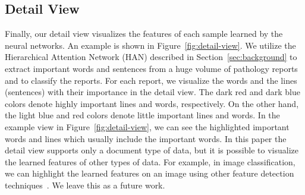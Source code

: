 \subsection{Detail View}
Finally, our detail view visualizes the features of each sample learned by the neural networks.
An example is shown in Figure~\ref{fig:detail-view}.
We utilize the Hierarchical Attention Network (HAN) described in Section~\ref{sec:background} to extract important words and sentences from a huge volume of pathology reports and to classify the reports.
For each report, we visualize the words and the lines (sentences) with their importance in the detail view.
The dark red and dark blue colors denote highly important lines and words, respectively.
On the other hand, the light blue and red colors denote little important lines and words.
In the example view in Figure~\ref{fig:detail-view}, we can see the highlighted important words and lines which usually include the important words.
In this paper the detail view supports only a document type of data, but it is possible to visualize the learned features of other types of data.
For example, in image classification, we can highlight the learned features on an image using other feature detection techniques~\cite{zhou2016learning}.
We leave this as a future work.

















